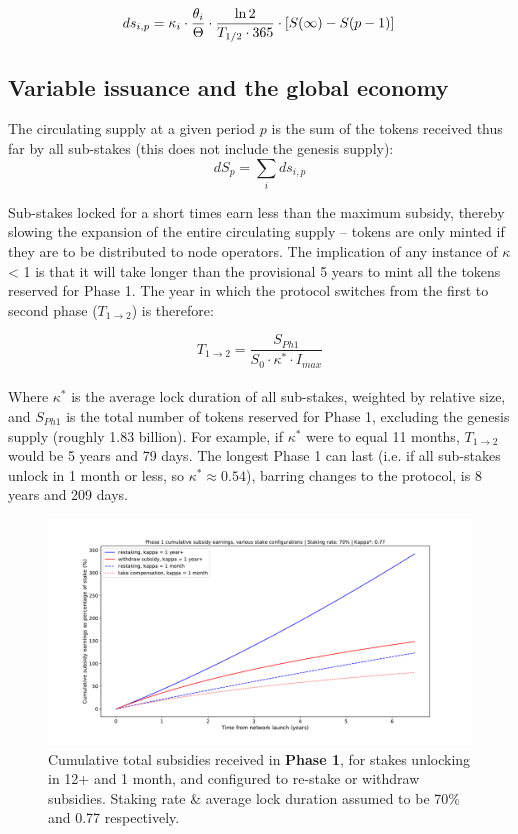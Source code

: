\documentclass[longbibliography,nofootinbib]{revtex4-1}
\begin{document}
\begin{equation}
    \label{eq:rate-max}
    ds_{i,p} = \kappa_i \cdot \frac{\theta_i}{\Theta} \cdot \frac{\ln{2}}{T_{1/2} \cdot 365 } \cdot \left[S(\infty) - S(p-1) \right]\\
\end{equation}

\subsection{Variable issuance and the global economy}

The circulating supply at a given period $p$ is the sum of the tokens received thus far by all sub-stakes (this does not include the genesis supply):
\begin{equation}
    dS_p= \sum_i ds_{i,p}
\end{equation}

Sub-stakes locked for a short times earn less than the maximum subsidy, thereby slowing the expansion of the entire circulating supply – tokens are only minted if they are to be distributed to node operators. The implication of any instance of $\kappa$ < 1 is that it will take longer than the provisional 5 years to mint all the tokens reserved for Phase 1. The year in which the protocol switches from the first to second phase ($T_{1\rightarrow2}$) is therefore: 

\begin{equation}
\label{phaseswitch}
    T_{1\rightarrow2}= \frac{S_{Ph1}}{S_0 \cdot \kappa^* \cdot I_{max}}
\end{equation}
\\
Where $\kappa^*$ is the average lock duration of all sub-stakes, weighted by relative size, and $S_{Ph1}$ is the total number of tokens reserved for Phase 1, excluding the genesis supply (roughly 1.83 billion). For example, if $\kappa^*$ were to equal 11 months, $T_{1\rightarrow2}$ would be  5 years and 79 days. The longest Phase 1 can last (i.e. if all sub-stakes unlock in 1 month or less, so $\kappa^* \approx 0.54$), barring changes to the protocol, is 8 years and 209 days.

\begin{figure}[h!]
    \includegraphics[width=\textwidth]{graphs/SubsidyP1.pdf}
    \caption{Cumulative total subsidies received in \textbf{Phase 1}, for stakes unlocking in 12+ and 1 month, and configured to re-stake or withdraw subsidies. Staking rate \& average lock duration assumed to be 70\% and 0.77 respectively.}
    \label{fig:tp}
\end{figure}
\end{document}
